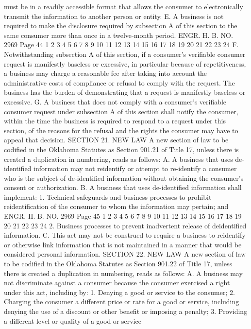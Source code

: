 must be in a readily accessible format that allows the consumer to
electronically transmit the information to another person or entity.
E. A business is not required to make the disclosure required
by subsection A of this section to the same consumer more than once
in a twelve-month period.
ENGR. H. B. NO. 2969 Page 44
1
2
3
4
5
6
7
8
9
10
11
12
13
14
15
16
17
18
19
20
21
22
23
24
F. Notwithstanding subsection A of this section, if a
consumer's verifiable consumer request is manifestly baseless or
excessive, in particular because of repetitiveness, a business may
charge a reasonable fee after taking into account the administrative
costs of compliance or refusal to comply with the request. The
business has the burden of demonstrating that a request is
manifestly baseless or excessive.
G. A business that does not comply with a consumer's verifiable
consumer request under subsection A of this section shall notify the
consumer, within the time the business is required to respond to a
request under this section, of the reasons for the refusal and the
rights the consumer may have to appeal that decision.
SECTION 21. NEW LAW A new section of law to be codified
in the Oklahoma Statutes as Section 901.21 of Title 17, unless there
is created a duplication in numbering, reads as follows:
A. A business that uses de-identified information may not reidentify or attempt to re-identify a consumer who is the subject of
de-identified information without obtaining the consumer's consent
or authorization.
B. A business that uses de-identified information shall
implement:
1. Technical safeguards and business processes to prohibit reidentification of the consumer to whom the information may pertain;
and
ENGR. H. B. NO. 2969 Page 45
1
2
3
4
5
6
7
8
9
10
11
12
13
14
15
16
17
18
19
20
21
22
23
24
2. Business processes to prevent inadvertent release of deidentified information.
C. This act may not be construed to require a business to reidentify or otherwise link information that is not maintained in a
manner that would be considered personal information.
SECTION 22. NEW LAW A new section of law to be codified
in the Oklahoma Statutes as Section 901.22 of Title 17, unless there
is created a duplication in numbering, reads as follows:
A. A business may not discriminate against a consumer because
the consumer exercised a right under this act, including by:
1. Denying a good or service to the consumer;
2. Charging the consumer a different price or rate for a good
or service, including denying the use of a discount or other benefit
or imposing a penalty;
3. Providing a different level or quality of a good or service

